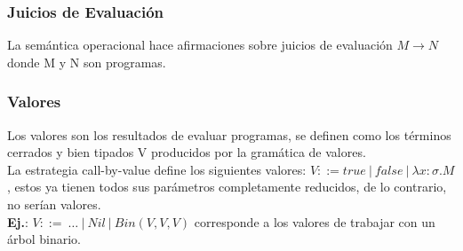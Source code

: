 \documentclass[10pt,a4paper]{article}
\begin{document}
\subsubsection*{Juicios de Evaluación}
La semántica operacional hace afirmaciones sobre juicios de evaluación $M \rightarrow N$ donde M y N son programas.
\subsubsection*{Valores}
Los valores son los resultados de evaluar programas, se definen como los términos cerrados y bien tipados V producidos por la gramática de valores. \\
La estrategia call-by-value define los siguientes valores: $V ::= true \ | \ false \ | \ \lambda x:\sigma.M$, estos ya tienen todos sus parámetros completamente reducidos, de lo contrario, no serían valores. \\
\textbf{Ej.}: $V ::= \ \dots \ | \ Nil \ | \ Bin(V, V, V)$ corresponde a los valores de trabajar con un árbol binario. 
\end{document}

